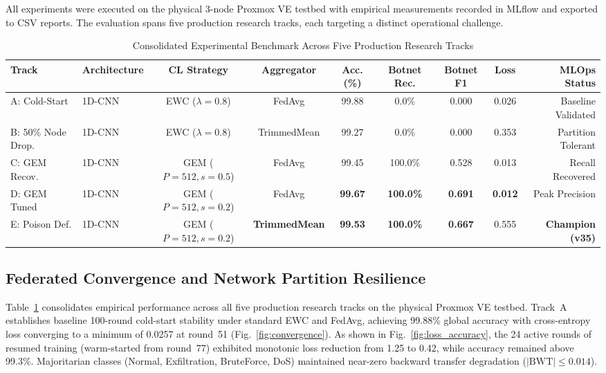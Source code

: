 \documentclass[journal,10pt,twocolumn]{IEEEtran}
\begin{document}
All experiments were executed on the physical 3-node Proxmox VE testbed with empirical measurements recorded in MLflow and exported to CSV reports. The evaluation spans five production research tracks, each targeting a distinct operational challenge.

\begin{table}[t]
\caption{Consolidated Experimental Benchmark Across Five Production Research Tracks}
\label{tab:main_results}
\centering
\footnotesize
\renewcommand{\arraystretch}{1.2}
\begin{tabular*}{\textwidth}{@{\extracolsep{\fill}}llccccccr@{}}
\toprule
\textbf{Track} & \textbf{Architecture} & \textbf{CL Strategy} & \textbf{Aggregator} & \textbf{Acc. (\%)} & \textbf{Botnet Rec.} & \textbf{Botnet F1} & \textbf{Loss} & \textbf{MLOps Status} \\
\midrule
A: Cold-Start & 1D-CNN & EWC ($\lambda{=}0.8$) & FedAvg & 99.88 & 0.0\% & 0.000 & 0.026 & Baseline Validated \\
B: 50\% Node Drop. & 1D-CNN & EWC ($\lambda{=}0.8$) & TrimmedMean & 99.27 & 0.0\% & 0.000 & 0.353 & Partition Tolerant \\
C: GEM Recov. & 1D-CNN & GEM ($P{=}512, s{=}0.5$) & FedAvg & 99.45 & 100.0\% & 0.528 & 0.013 & Recall Recovered \\
D: GEM Tuned & 1D-CNN & GEM ($P{=}512, s{=}0.2$) & FedAvg & \textbf{99.67} & \textbf{100.0\%} & \textbf{0.691} & \textbf{0.012} & Peak Precision \\
E: Poison Def. & 1D-CNN & GEM ($P{=}512, s{=}0.2$) & \textbf{TrimmedMean} & \textbf{99.53} & \textbf{100.0\%} & \textbf{0.667} & 0.555 & \textbf{Champion (v35)} \\
\bottomrule
\end{tabular*}
\end{table}

\subsection{Federated Convergence and Network Partition Resilience}
Table~\ref{tab:main_results} consolidates empirical performance across all five production research tracks on the physical Proxmox VE testbed. Track~A establishes baseline 100-round cold-start stability under standard EWC and FedAvg, achieving 99.88\% global accuracy with cross-entropy loss converging to a minimum of 0.0257 at round~51 (Fig.~\ref{fig:convergence}). As shown in Fig.~\ref{fig:loss_accuracy}, the 24 active rounds of resumed training (warm-started from round~77) exhibited monotonic loss reduction from 1.25 to 0.42, while accuracy remained above 99.3\%. Majoritarian classes (Normal, Exfiltration, BruteForce, DoS) maintained near-zero backward transfer degradation ($|\text{BWT}| \le 0.014$).
\end{document}
